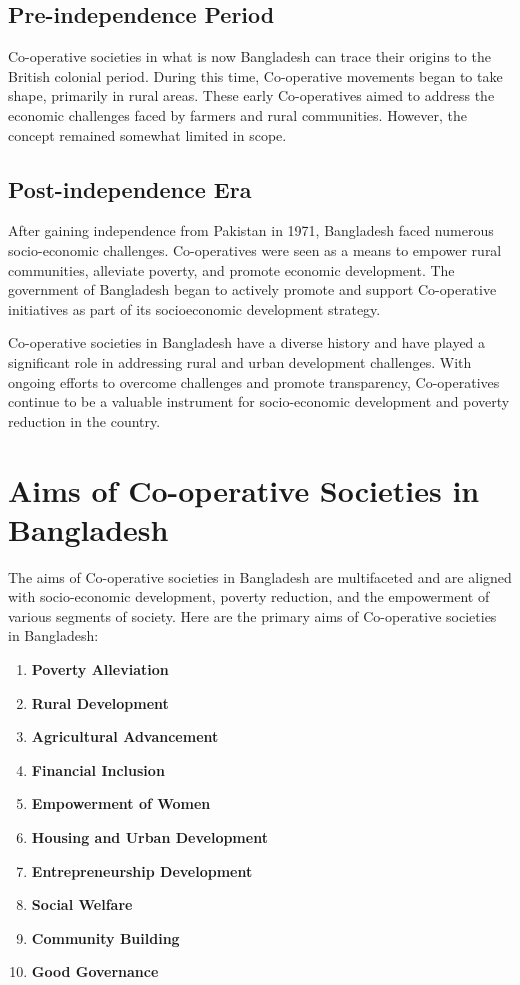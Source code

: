 \subsection{Pre-independence Period}

Co-operative societies in what is now Bangladesh can trace their origins to the British colonial period. During this time, Co-operative movements began to take shape, primarily in rural areas. These early Co-operatives aimed to address the economic challenges faced by farmers and rural communities. However, the concept remained somewhat limited in scope.

\subsection{Post-independence Era}

After gaining independence from Pakistan in 1971, Bangladesh faced numerous socio-economic challenges. Co-operatives were seen as a means to empower rural communities, alleviate poverty, and promote economic development. The government of Bangladesh began to actively promote and support Co-operative initiatives as part of its socioeconomic development strategy.

Co-operative societies in Bangladesh have a diverse history and have played a significant role in addressing rural and urban development challenges. With ongoing efforts to overcome challenges and promote transparency, Co-operatives continue to be a valuable instrument for socio-economic development and poverty reduction in the country.



\section{Aims of Co-operative Societies in Bangladesh}

The aims of Co-operative societies in Bangladesh are multifaceted and are aligned with socio-economic development, poverty reduction, and the empowerment of various segments of society. Here are the primary aims of Co-operative societies in Bangladesh:

\begin{enumerate}
    \item \textbf{Poverty Alleviation}
    \item \textbf{Rural Development}
    \item \textbf{Agricultural Advancement}
    \item \textbf{Financial Inclusion}
    \item \textbf{Empowerment of Women}
    \item \textbf{Housing and Urban Development}
    \item \textbf{Entrepreneurship Development}
    \item \textbf{Social Welfare}
    \item \textbf{Community Building}
    \item \textbf{Good Governance}
\end{enumerate}

